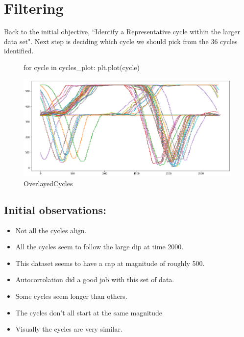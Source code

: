 \section{Filtering} \label{filtering}
Back to the initial objective, ``Identify a Representative cycle within the larger data set". Next step is deciding which cycle we should pick from the 36 cycles identified. 
\begin{figure}[ht]

\begin{python}
for cycle in cycles_plot:
    plt.plot(cycle)
\end{python}

\includegraphics[scale=0.45]{images/cyclesOverlayed.png}
\caption{OverlayedCycles}
\label{OverlayedCycles}
\end{figure}


\subsection{Initial observations:}
\begin{itemize}

    \item Not all the cycles align.
    
    \item All the cycles seem to follow the large dip at time 2000.
    
    \item This dataset seems to have a cap at magnitude of roughly
    500.
    \item Autocorrolation did a good job with this set of data.
    
    \item Some cycles seem longer than others.
    
    \item  The cycles don't all start at the same magnitude 
    
    \item Visually the cycles are very similar.
    
\end{itemize}

